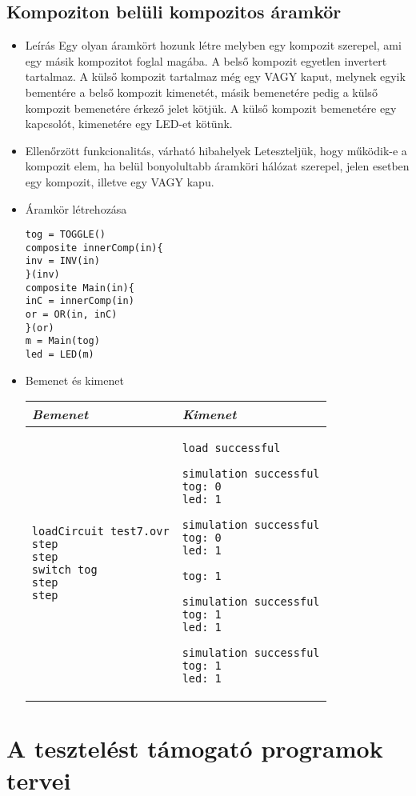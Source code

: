 \subsection{Kompoziton belüli kompozitos áramkör}
\begin{itemize}
\item Leírás\newline
Egy olyan áramkört hozunk létre melyben egy kompozit szerepel, ami egy másik kompozitot foglal magába. A belső kompozit egyetlen invertert tartalmaz. A külső kompozit tartalmaz még egy VAGY kaput, melynek egyik bementére a belső kompozit kimenetét, másik bemenetére pedig a külső kompozit bemenetére érkező jelet kötjük. A külső kompozit bemenetére egy kapcsolót, kimenetére egy LED-et kötünk.
\item Ellenőrzött funkcionalitás, várható hibahelyek\newline
Leteszteljük, hogy működik-e a kompozit elem, ha belül bonyolultabb áramköri hálózat szerepel, jelen esetben egy kompozit, illetve egy VAGY kapu.

\item Áramkör létrehozása

\begin{verbatim}
tog = TOGGLE()
composite innerComp(in){
inv = INV(in)
}(inv)
composite Main(in){
inC = innerComp(in)
or = OR(in, inC)
}(or)
m = Main(tog)
led = LED(m)
\end{verbatim}

\item Bemenet és kimenet\newline

\begin{tabular}{|p{7cm}|p{7cm}|} 
\hline 
\textit{Bemenet} & \textit{Kimenet} \\ \hline
\begin{verbatim}
loadCircuit test7.ovr
step
step
switch tog
step
step
\end{verbatim}
& 
\begin{verbatim}
load successful

simulation successful
tog: 0
led: 1

simulation successful
tog: 0
led: 1

tog: 1

simulation successful
tog: 1
led: 1

simulation successful
tog: 1
led: 1
\end{verbatim}
\\ \hline
\end{tabular}

\end{itemize}


\section{A tesztelést támogató programok tervei}

